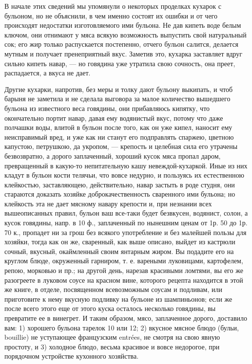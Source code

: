 В начале этих сведений мы упомянули о некоторых проделках кухарок с бульоном, но не объяснили, в чем именно состоят их ошибки и от чего происходят недостатки изготовляемого ими бульона. Не дав кипеть воде белым ключом, они отнимают у мяса всякую возможность выпустить свой натуральный сок; его жир только распускается постепенно, отчего бульон салится, делается мутным и получает пренеприятный вкус. Заметив это, кухарка заставляет вдруг сильно кипеть навар, — но говядина уже утратила свою сочность, она преет, распадается, а вкуса не дает.

Другие кухарки, напротив, без меры и толку дают бульону выкипать, и чтоб барыня не заметила и не сделала выговора за малое количество вышедшего бульона из известного веса говядины, они прибавляюсь кипятку, что окончательно портит навар, давая ему водянистый вкус, потому что даже полчашки воды, влитой в бульон после того, как он уже кипел, наносит ему неисправимый вред, и уже как ни станут его подправлять спаржею, цветною капустою, петрушкою, да укропом, — крепость и целебная сила его утрачены безвозвратно, а дорого заплаченный, хороший кусок мяса пропал даром, превращенный в какую-то непитательную кашу невеждой-кухаркой. Иные из них кладут в бульон кости телячьи, что вовсе недурно, и пользуясь их естественною клейкостью, заставляющею, действительно, навар застыть в роде студня, они стараются доказать хозяйке доброкачественность сваренного ими бульона; но клейкость эта не дает мясному навару крепости и, при незнании всех вышеописанных правил, бульон ваш все-таки будет безвкусен, водянист, солон, а кусок говядины, напр. в 10 ф., заплаченный по нынешним ценам от 1р. 50 до 1р. 70 к., пропадет ни за грош без всякого употребление и без малейшей пользы для хозяйки, тогда как он же, сваренный, как выше описано, выйдет из кастрюли сочный, вкусный, окаймленный своим янтарным жиром. Вы подадите его на круглом блюде, окруженный гарниром, т. е. вареными луковицами, картофелем, репою, морковью и пр.; на другой день, нарезав красивыми ломтями, вы его же разогреете в луковом соусе на красном вине, которого рецепта находится в этой же книге, в отделе, посвященном всевозможным соусам и подливам, или приготовите к нему вкусную подливку на бульоне из шампиньонов; если же после всего этого еще от этого куска осталось несколько говядины, вы превратите ее в винегрет. И таким образом, мясо, заплаченное дорого, доставило вам: 1) хорошего бульона тарелок 10 или 12; 2) вкусное мясное блюдо (бульи, bouillie) не уступающее французским entrées, не смотря на свою явную простоту, и 3) холодное блюдо, весьма красивое и вовсе недорогое, при порядочном устройстве кухонного хозяйства.

